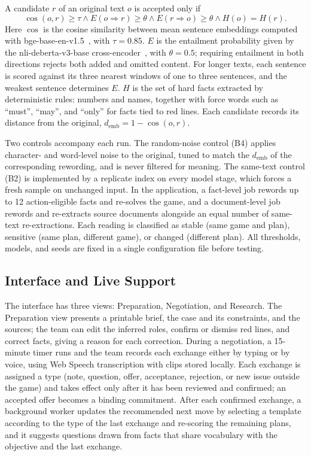 \documentclass[10pt,twocolumn,letterpaper]{article}
\begin{document}
A candidate $r$ of an original text $o$ is accepted only if
\[\cos(o,r)\ge\tau \wedge E(o{\Rightarrow}r)\ge\theta \wedge E(r{\Rightarrow}o)\ge\theta \wedge H(o)=H(r).\]
Here $\cos$ is the cosine similarity between mean sentence embeddings computed with bge-base-en-v1.5~\cite{bge}, with $\tau=0.85$. $E$ is the entailment probability given by the nli-deberta-v3-base cross-encoder~\cite{sbert,deberta}, with $\theta=0.5$; requiring entailment in both directions rejects both added and omitted content. For longer texts, each sentence is scored against its three nearest windows of one to three sentences, and the weakest sentence determines $E$. $H$ is the set of hard facts extracted by deterministic rules: numbers and names, together with force words such as ``must'', ``may'', and ``only'' for facts tied to red lines. Each candidate records its distance from the original, $d_{\text{emb}}=1-\cos(o,r)$.

Two controls accompany each run. The random-noise control (B4) applies character- and word-level noise to the original, tuned to match the $d_{\text{emb}}$ of the corresponding rewording, and is never filtered for meaning. The same-text control (B2) is implemented by a replicate index on every model stage, which forces a fresh sample on unchanged input. In the application, a fact-level job rewords up to 12 action-eligible facts and re-solves the game, and a document-level job rewords and re-extracts source documents alongside an equal number of same-text re-extractions. Each reading is classified as stable (same game and plan), sensitive (same plan, different game), or changed (different plan). All thresholds, models, and seeds are fixed in a single configuration file before testing.

\subsection{Interface and Live Support}
The interface has three views: Preparation, Negotiation, and Research. The Preparation view presents a printable brief, the case and its constraints, and the sources; the team can edit the inferred roles, confirm or dismiss red lines, and correct facts, giving a reason for each correction. During a negotiation, a 15-minute timer runs and the team records each exchange either by typing or by voice, using Web Speech transcription with clips stored locally. Each exchange is assigned a type (note, question, offer, acceptance, rejection, or new issue outside the game) and takes effect only after it has been reviewed and confirmed; an accepted offer becomes a binding commitment. After each confirmed exchange, a background worker updates the recommended next move by selecting a template according to the type of the last exchange and re-scoring the remaining plans, and it suggests questions drawn from facts that share vocabulary with the objective and the last exchange.
\end{document}
